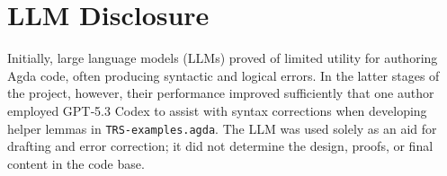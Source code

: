 \section{LLM Disclosure}

Initially, large language models (LLMs) proved of limited utility for authoring Agda code, often producing syntactic and logical errors. In the latter stages of the project, however, their performance improved sufficiently that one author employed GPT‑5.3 Codex to assist with syntax corrections when developing helper lemmas in \texttt{TRS-examples.agda}. The LLM was used solely as an aid for drafting and error correction; it did not determine the design, proofs, or final content in the code base. 
